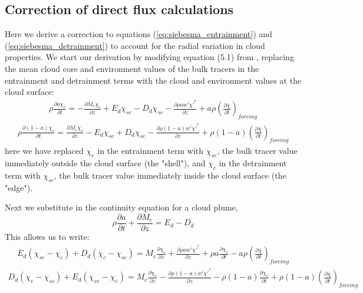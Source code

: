 \documentclass[draft,grl]{agutex}
\begin{document}
\begin{article}
\section{Correction of direct flux calculations}

Here we derive a correction to equations (\ref{eq:siebesma_entrainment}) and 
(\ref{eq:siebesma_detrainment}) to account for the radial variation in cloud 
properties.  We start our derivation by modifying equation (5.1) from 
\cite{Siebesma1995}, replacing the mean cloud core and environment values of 
the bulk tracers in the entrainment and detrainment terms with the cloud and 
environment values at the cloud surface:
\begin{eqnarray}
  \label{eq:entrainment_derivation_1}
    \rho \frac{\partial a \chi_c}{\partial t} 
    = - \frac{\partial M_c \chi_c}{\partial z} 
    + E_d \chi_{se} - D_d \chi_{sc} 
    - \frac{\partial \rho a \overline{w' \chi'}^c}{\partial z} 
    + a \rho \left(\frac{\partial \bar{\chi}}{\partial t}\right)_{forcing}
\end{eqnarray}
\begin{eqnarray}
  \label{eq:detrainment_derivation_1}
    \rho \frac{\partial (1 - a) \chi_e}{\partial t}
    = \frac{\partial M_c \chi_e}{\partial z} 
    - E_d \chi_{se} + D_d \chi_{sc} 
    - \frac{\partial \rho (1 - a) \overline{w' \chi'}^e}{\partial z} 
    + \rho (1 - a) \left(\frac{\partial \bar{\chi}}{\partial t}\right)_{forcing}
\end{eqnarray}
here we have replaced $\chi_e$ in the entrainment term with $\chi_{se}$, the 
bulk tracer value immediately outside the cloud surface (the "shell"), and 
$\chi_c$ in the detrainment term with $\chi_{sc}$, the bulk tracer value 
immediately inside the cloud surface (the "edge").

Next we substitute in the continuity equation for a cloud plume,
\begin{equation}
   \label{eq:continuity}
   \rho \frac{\partial a}{\partial t} + \frac{\partial M_c}{\partial z} = E_d - D_d
\end{equation}
This allows us to write:
\begin{eqnarray}
  \label{eq:entrainment_derivation_2}
    E_d (\chi_{se} - \chi_c) + D_d (\chi_c - \chi_{sc}) 
    = M_c \frac{\partial \chi_c}{\partial z}
    + \frac{\partial \rho a \overline{w' \chi'}^c}{\partial z} 
    + \rho a \frac{\partial \chi_c}{\partial t}
    - a \rho \left(\frac{\partial \bar{\chi}}{\partial t}\right)_{forcing}
\end{eqnarray}
\begin{eqnarray}
  \label{eq:detrainment_derivation_2}
    D_d (\chi_e - \chi_{sc}) + E_d (\chi_{se} - \chi_e)
    = M_c \frac{\partial \chi_e}{\partial z}
    - \frac{\partial \rho (1 - a) \overline{w' \chi'}^e}{\partial z} 
    - \rho (1 - a) \frac{\partial \chi_e}{\partial t}
    + \rho (1 - a) \left(\frac{\partial \bar{\chi}}{\partial t}\right)_{forcing}
\end{eqnarray}


\end{article}
\end{document}
